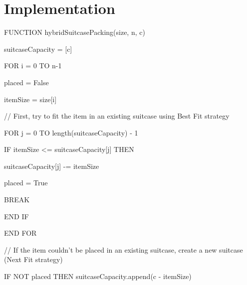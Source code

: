 \documentclass[12pt]{article}
\begin{document}
\section{Implementation}
FUNCTION hybridSuitcasePacking(size, n, c)

    suitcaseCapacity = [c]
\vspace{0.2cm}

    FOR i = 0 TO n-1
    
\hspace{}       placed = False\    

        itemSize = size[i]
\vspace{0.1cm} 

        // First, try to fit the item in an existing suitcase using Best Fit strategy
        
\vspace{0.1cm}

        FOR j = 0 TO length(suitcaseCapacity) - 1
\vspace{0.1cm}

\hspace{1cm}IF itemSize <= suitcaseCapacity[j] THEN

\vspace{0,1cm}

\hspace{1cm}                  suitcaseCapacity[j] -= itemSize
\vspace{0.1cm}

\hspace{1cm}               placed = True

\vspace{0.1cm}

\hspace{1cm}                             BREAK
\vspace{0.1cm}   

\hspace{0.5cm}            END IF
\vspace{0.1cm} 
            
\hspace{0.1cm}        END FOR

\vspace{0.1cm}
\hspace{0.1cm}        // If the item couldn't be placed in an existing suitcase, create a new suitcase (Next Fit strategy)

\vspace{0.1cm}

        IF NOT placed THEN
            suitcaseCapacity.append(c - itemSize)
\end{document}
